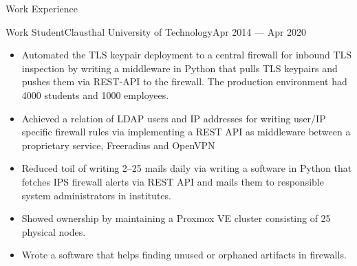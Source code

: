 \documentclass[]{mcdowellcv}
\begin{document}
\begin{cvsection}{Work Experience}
\begin{cvsubsection}{Work Student}{Clausthal University of Technology}{Apr 2014 --- Apr 2020}
\begin{itemize}
\item Automated the TLS keypair deployment to a central firewall for inbound TLS inspection by writing a middleware in Python that pulls TLS keypairs and pushes them via REST-API to the firewall. The production environment had 4000 students and 1000 employees.
\item Achieved a relation of LDAP users and IP addresses for writing user/IP specific firewall rules via implementing
a REST API as middleware between a proprietary service, Freeradius and OpenVPN
\item Reduced toil of writing 2--25 mails daily via writing a software in Python that fetches IPS firewall alerts via REST API and mails them
to responsible system administrators in institutes.
\item Showed ownership by maintaining a Proxmox VE cluster consisting of 25 physical nodes.
\item Wrote a software that helps finding unused or orphaned artifacts in firewalls.
\end{itemize}
\end{cvsubsection}
\end{cvsection}
\end{document}
